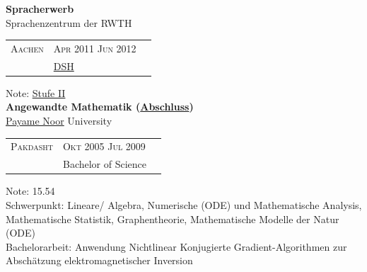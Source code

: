 \documentclass[onside]{article}
\makeatletter
\newcommand{\cvevent}[5]{
        {\scshape\fontseries{light}\selectfont\footnotesize \faMapMarker{} #1 \qquad{} \faCalendar{} #2 \textendash{} #3} \\
}
\renewcommand{\cvevent}[6]{
    \begin{tabularx}{\linewidth}{@{}l@{\hspace{#6}}Xr@{}}
    {\scshape\fontseries{light}\selectfont\footnotesize \scalebox{1.144}{\faMapMarker}{} #1} & {\scshape\fontseries{light}\selectfont\footnotesize \faCalendar{} #2 \textendash{} #3} \\
    {{#4:} & {#5}} \\[1ex]
    \end{tabularx}
}
\newcommand{\externallink}[2]{
    \href{#1}{\scalebox{#2}{\faExternalLink}}
}
\renewcommand{\externallink}[3]{%
    \ifthenelse{\equal{#3}{true}}{%
        \href{#1}{$^{\scalebox{#2}{\faExternalLink}}$}%
    }{%
        \href{#1}{\scalebox{#2}{\faExternalLink}}%
    }%
}
\renewcommand{\externallink}[5]{%
    \href{#1}{\raisebox{{#3}ex}{\hspace{{#4}em}\rotatebox{#5}{\scalebox{#2}{\faExternalLink}}}}%
}
\makeatother
\begin{document}
{\begin{minipage}[t][\dimexpr\textheight-2\fboxrule-2\fboxsep\relax][t]{\dimexpr0.6\textwidth-2\fboxrule-2\fboxsep\relax}
        {\large \textbf{Spracherwerb}} \\
        \faUniversity{} Sprachenzentrum der RWTH \\
        \cvevent{Aachen}{Apr 2011}{Jun 2012}{Abschluss}{\href{https://de.wikipedia.org/wiki/Deutsche_Sprachpr\%C3\%BCfung_f\%C3\%BCr_den_Hochschulzugang}{\textcolor{cyan!70!black}{DSH}}}{.575cm}
        {Note: \href{https://montahaee.github.io/assets/pdf/de/apply/sprach_zeugnis.pdf}{\textcolor{cyan!70!black}{Stufe II}}} \\[1ex]

        {\large \textbf{Angewandte Mathematik (\href{https://montahaee.github.io/assets/pdf/en/apply/bsc_degree.pdf}{\textcolor{cyan!60!black}{Abschluss}})}} \\
        \faUniversity{} \href{https://en.wikipedia.org/wiki/Payame_Noor_University}{\textcolor{green!30!black}{Payame Noor}} University{\textcolor{green!30!black}{\externallink{https://en.wikipedia.org/wiki/Payame_Noor_University}{0.82}{1.25}{-0.23}{0}}}
        \cvevent{Pakdasht}{Okt 2005}{Jul 2009}{Studiengang}{Bachelor of Science}{.1cm}
        {Note: 15.54} \\[1ex]
        {\footnotesize Schwerpunkt: Lineare/ Algebra, Numerische (ODE) und Mathematische Analysis, Mathematische Statistik, Graphentheorie, Mathematische Modelle der Natur (ODE)} \\
        {\footnotesize Bachelorarbeit: Anwendung Nichtlinear Konjugierte Gradient-Algorithmen zur Abschätzung elektromagnetischer Inversion} \\[2ex]
         \vspace{+5pt}

\end{minipage}}
\end{document}
